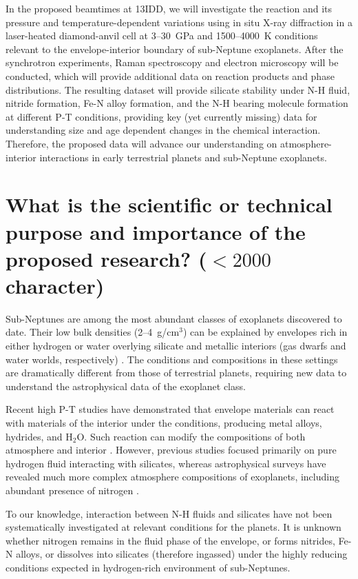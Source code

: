 In the proposed beamtimes at 13IDD, we will investigate the reaction and its pressure and temperature-dependent variations using in situ X-ray diffraction in a laser-heated diamond-anvil cell at {3--30~GPa and 1500--4000~K} conditions relevant to the envelope-interior boundary of sub-Neptune exoplanets. 
After the synchrotron experiments, Raman spectroscopy and electron microscopy will be conducted, which will provide additional data on reaction products and phase distributions. 
The resulting dataset will provide {silicate stability under N-H fluid,} nitride formation, Fe-N alloy formation, and the N-H bearing molecule formation at different P-T conditions, providing key (yet currently missing) data for understanding size and age dependent changes in the chemical interaction.
Therefore, the proposed data will advance our understanding on atmosphere-interior interactions in early terrestrial planets and sub-Neptune exoplanets.

\section{What is the scientific or technical purpose and importance of the proposed research?  ($<2000$ character)}

Sub-Neptunes are among the most abundant classes of exoplanets discovered to date. 
Their low bulk densities (2--4~g/cm$^3$) can be explained by envelopes rich in either hydrogen or water overlying silicate and metallic interiors (gas dwarfs and water worlds, respectively) \cite{bean_Nature_2021}.
The conditions and compositions in these settings are dramatically different from those of terrestrial planets, requiring new data to understand the astrophysical data of the exoplanet class.

Recent high P-T studies have demonstrated that envelope materials can react with materials of the interior under the conditions, producing metal alloys, hydrides, and H$_2$O. 
Such reaction can modify the compositions of both atmosphere and interior \cite{horn_Building_2025, kim_Stability_2023, miozzi_Experiments_2025}. 
However, previous studies focused primarily on pure hydrogen fluid interacting with silicates, whereas astrophysical surveys have revealed much more complex atmosphere compositions of exoplanets, including abundant presence of nitrogen \cite{radecka_Nitrogen_2025}.

To our knowledge, interaction between N-H fluids and silicates have not been systematically investigated at relevant conditions for the planets. %
It is unknown whether nitrogen remains in the fluid phase of the envelope, or forms nitrides, Fe-N alloys, or dissolves into silicates (therefore ingassed) under the highly reducing conditions expected in hydrogen-rich environment of sub-Neptunes.

